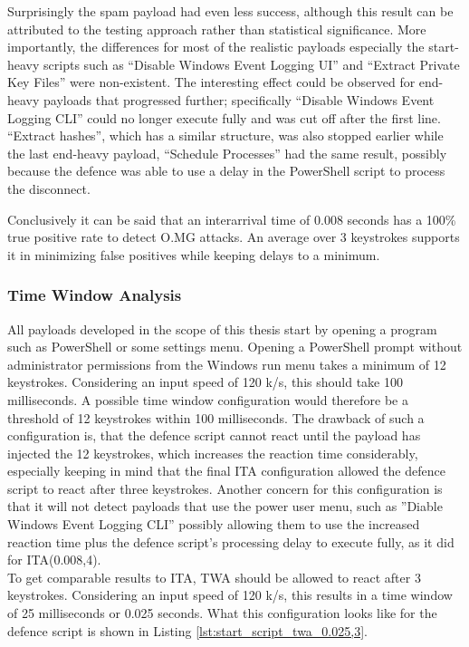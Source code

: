 Surprisingly the spam payload had even less success, although this result can be attributed to the testing approach rather than statistical significance. More importantly, the differences for most of the realistic payloads especially the start-heavy scripts such as ``Disable Windows Event Logging UI'' and ``Extract Private Key Files'' were non-existent. The interesting effect could be observed for end-heavy payloads that progressed further; specifically ``Disable Windows Event Logging CLI'' could no longer execute fully and was cut off after the first line. ``Extract hashes'', which has a similar structure, was also stopped earlier while the last end-heavy payload, ``Schedule Processes'' had the same result, possibly because the defence was able to use a delay in the PowerShell script to process the disconnect.  


Conclusively it can be said that an interarrival time of 0.008 seconds has a 100\% true positive rate to detect O.MG attacks. An average over 3 keystrokes supports it in minimizing false positives while keeping delays to a minimum.



\subsubsection{Time Window Analysis}


All payloads developed in the scope of this thesis start by opening a program such as PowerShell or some settings menu. Opening a PowerShell prompt without administrator permissions from the Windows run menu takes a minimum of 12 keystrokes. Considering an input speed of 120 k/s, this should take 100 milliseconds. A possible time window configuration would therefore be a threshold of 12 keystrokes within 100 milliseconds. The drawback of such a configuration is, that the defence script cannot react until the payload has injected the 12 keystrokes, which increases the reaction time considerably, especially keeping in mind that the final ITA configuration allowed the defence script to react after three keystrokes. Another concern for this configuration is that it will not detect payloads that use the power user menu, such as ''Diable Windows Event Logging CLI'' possibly allowing them to use the increased reaction time plus the defence script's processing delay to execute fully, as it did for ITA(0.008,4). \\
To get comparable results to ITA, TWA should be allowed to react after 3 keystrokes. Considering an input speed of 120 k/s, this results in a time window of 25 milliseconds or 0.025 seconds. What this configuration looks like for the defence script is shown in Listing \ref{lst:start_script_twa_0.025,3}.

